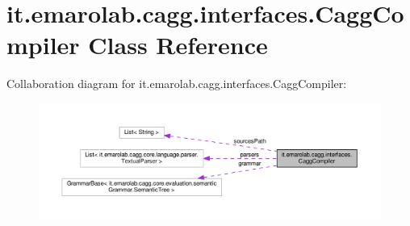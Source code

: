 \hypertarget{classit_1_1emarolab_1_1cagg_1_1interfaces_1_1CaggCompiler}{\section{it.\-emarolab.\-cagg.\-interfaces.\-Cagg\-Compiler Class Reference}
\label{classit_1_1emarolab_1_1cagg_1_1interfaces_1_1CaggCompiler}
}


Collaboration diagram for it.\-emarolab.\-cagg.\-interfaces.\-Cagg\-Compiler\-:\nopagebreak
\begin{figure}[H]
\begin{center}
\leavevmode
\includegraphics[width=350pt]{classit_1_1emarolab_1_1cagg_1_1interfaces_1_1CaggCompiler__coll__graph}
\end{center}
\end{figure}

